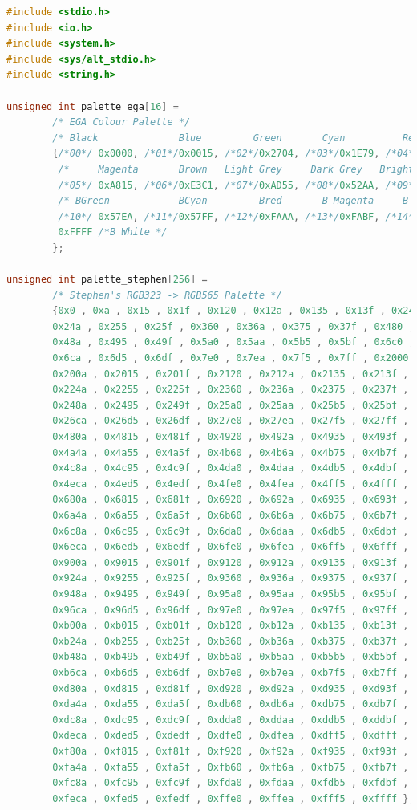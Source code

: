 \documentclass{capstonedoc}
\begin{document}
\begin{lstlisting}[language=c,caption={Sample Program that Generates a Test Pattern, then changes the color},label={lst:testcode},tabsize=2]
#include <stdio.h>
#include <io.h>
#include <system.h>
#include <sys/alt_stdio.h>
#include <string.h>

unsigned int palette_ega[16] =
		/* EGA Colour Palette */
		/* Black			  Blue	       Green       Cyan          Red */
		{/*00*/ 0x0000, /*01*/0x0015, /*02*/0x2704, /*03*/0x1E79, /*04*/0xA800,
		 /*     Magenta       Brown   Light Grey     Dark Grey   Bright Blue*/
		 /*05*/ 0xA815, /*06*/0xE3C1, /*07*/0xAD55, /*08*/0x52AA, /*09*/0x52BF,
		 /* BGreen            BCyan         Bred       B Magenta     B Yellow*/
		 /*10*/ 0x57EA, /*11*/0x57FF, /*12*/0xFAAA, /*13*/0xFABF, /*14*/0xFFEA,
		 0xFFFF /*B White */
		};

unsigned int palette_stephen[256] =
		/* Stephen's RGB323 -> RGB565 Palette */
		{0x0 , 0xa , 0x15 , 0x1f , 0x120 , 0x12a , 0x135 , 0x13f , 0x240 ,
		0x24a , 0x255 , 0x25f , 0x360 , 0x36a , 0x375 , 0x37f , 0x480 ,
		0x48a , 0x495 , 0x49f , 0x5a0 , 0x5aa , 0x5b5 , 0x5bf , 0x6c0 ,
		0x6ca , 0x6d5 , 0x6df , 0x7e0 , 0x7ea , 0x7f5 , 0x7ff , 0x2000 ,
		0x200a , 0x2015 , 0x201f , 0x2120 , 0x212a , 0x2135 , 0x213f , 0x2240 ,
		0x224a , 0x2255 , 0x225f , 0x2360 , 0x236a , 0x2375 , 0x237f , 0x2480 ,
		0x248a , 0x2495 , 0x249f , 0x25a0 , 0x25aa , 0x25b5 , 0x25bf , 0x26c0 ,
		0x26ca , 0x26d5 , 0x26df , 0x27e0 , 0x27ea , 0x27f5 , 0x27ff , 0x4800 ,
		0x480a , 0x4815 , 0x481f , 0x4920 , 0x492a , 0x4935 , 0x493f , 0x4a40 ,
		0x4a4a , 0x4a55 , 0x4a5f , 0x4b60 , 0x4b6a , 0x4b75 , 0x4b7f , 0x4c80 ,
		0x4c8a , 0x4c95 , 0x4c9f , 0x4da0 , 0x4daa , 0x4db5 , 0x4dbf , 0x4ec0 ,
		0x4eca , 0x4ed5 , 0x4edf , 0x4fe0 , 0x4fea , 0x4ff5 , 0x4fff , 0x6800 ,
		0x680a , 0x6815 , 0x681f , 0x6920 , 0x692a , 0x6935 , 0x693f , 0x6a40 ,
		0x6a4a , 0x6a55 , 0x6a5f , 0x6b60 , 0x6b6a , 0x6b75 , 0x6b7f , 0x6c80 ,
		0x6c8a , 0x6c95 , 0x6c9f , 0x6da0 , 0x6daa , 0x6db5 , 0x6dbf , 0x6ec0 ,
		0x6eca , 0x6ed5 , 0x6edf , 0x6fe0 , 0x6fea , 0x6ff5 , 0x6fff , 0x9000 ,
		0x900a , 0x9015 , 0x901f , 0x9120 , 0x912a , 0x9135 , 0x913f , 0x9240 ,
		0x924a , 0x9255 , 0x925f , 0x9360 , 0x936a , 0x9375 , 0x937f , 0x9480 ,
		0x948a , 0x9495 , 0x949f , 0x95a0 , 0x95aa , 0x95b5 , 0x95bf , 0x96c0 ,
		0x96ca , 0x96d5 , 0x96df , 0x97e0 , 0x97ea , 0x97f5 , 0x97ff , 0xb000 ,
		0xb00a , 0xb015 , 0xb01f , 0xb120 , 0xb12a , 0xb135 , 0xb13f , 0xb240 ,
		0xb24a , 0xb255 , 0xb25f , 0xb360 , 0xb36a , 0xb375 , 0xb37f , 0xb480 ,
		0xb48a , 0xb495 , 0xb49f , 0xb5a0 , 0xb5aa , 0xb5b5 , 0xb5bf , 0xb6c0 ,
		0xb6ca , 0xb6d5 , 0xb6df , 0xb7e0 , 0xb7ea , 0xb7f5 , 0xb7ff , 0xd800 ,
		0xd80a , 0xd815 , 0xd81f , 0xd920 , 0xd92a , 0xd935 , 0xd93f , 0xda40 ,
		0xda4a , 0xda55 , 0xda5f , 0xdb60 , 0xdb6a , 0xdb75 , 0xdb7f , 0xdc80 ,
		0xdc8a , 0xdc95 , 0xdc9f , 0xdda0 , 0xddaa , 0xddb5 , 0xddbf , 0xdec0 ,
		0xdeca , 0xded5 , 0xdedf , 0xdfe0 , 0xdfea , 0xdff5 , 0xdfff , 0xf800 ,
		0xf80a , 0xf815 , 0xf81f , 0xf920 , 0xf92a , 0xf935 , 0xf93f , 0xfa40 ,
		0xfa4a , 0xfa55 , 0xfa5f , 0xfb60 , 0xfb6a , 0xfb75 , 0xfb7f , 0xfc80 ,
		0xfc8a , 0xfc95 , 0xfc9f , 0xfda0 , 0xfdaa , 0xfdb5 , 0xfdbf , 0xfec0 ,
		0xfeca , 0xfed5 , 0xfedf , 0xffe0 , 0xffea , 0xfff5 , 0xffff };


\end{lstlisting}
\end{document}
